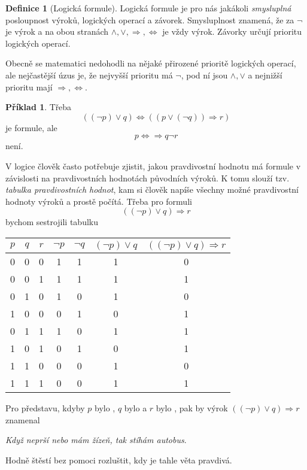 \documentclass[a4paper,11pt]{article}
\theoremstyle{definition}
\newtheorem{exm}[thm]{Příklad}
\newtheorem{dfn}[thm]{Definice}
\theoremstyle{plain}
\begin{document}
\begin{dfn}[Logická formule]
 Logická formule je pro nás jakákoli \emph{smysluplná} posloupnost výroků,
 logických operací a závorek. Smysluplnost znamená, že za $\neg$ je výrok a na
 obou stranách $ \wedge , \vee , \Rightarrow , \Leftrightarrow $ je vždy výrok.
 Závorky určují prioritu logických operací.
\end{dfn}

Obecně se matematici nedohodli na nějaké přirozené prioritě logických operací,
ale nejčastější úzus je, že nejvyšší prioritu má $\neg$, pod ní jsou  $ \wedge ,
\vee $ a nejnižší prioritu mají $ \Rightarrow , \Leftrightarrow $.

\begin{exm}
 \label{exm:formula}
 Třeba
 \[
  ((\neg p) \vee q) \Leftrightarrow ((p \vee (\neg q)) \Rightarrow r) 
 \]
 je formule, ale
 \[
  p \Leftrightarrow  \Rightarrow q \neg r
 \]
 není.
\end{exm}

V logice člověk často potřebuje zjistit, jakou pravdivostní hodnotu má formule v
závislosti na pravdivostních hodnotách původních výroků. K tomu slouží tzv.
\emph{tabulka pravdivostních hodnot}, kam si člověk napíše všechny možné
pravdivostní hodnoty výroků a prostě počítá. Třeba pro formuli 
\[
 ((\neg p) \vee q) \Rightarrow r
\]
bychom sestrojili tabulku

\begin{center}
 \begin{tabular}{c|c|c|c|c|c|c}
  $p$ & $q$ & $r$ & $\neg p$ & $\neg q$ & $(\neg p) \vee q$ & $((\neg p) \vee q)
  \Rightarrow r$\\
  \midrule
  0 & 0 & 0 & 1 & 1 & 1 & 0\\
  0 & 0 & 1 & 1 & 1 & 1 & 1\\
  0 & 1 & 0 & 1 & 0 & 1 & 0\\
  1 & 0 & 0 & 0 & 1 & 0 & 1\\
  0 & 1 & 1 & 1 & 0 & 1 & 1\\
  1 & 0 & 1 & 0 & 1 & 0 & 1\\
  1 & 1 & 0 & 0 & 0 & 1 & 0\\
  1 & 1 & 1 & 0 & 0 & 1 & 1
 \end{tabular}
\end{center}

Pro představu, kdyby $p$ bylo , $q$ bylo  a $r$ bylo
, pak by výrok $((\neg p) \vee q) \Rightarrow r$ znamenal
\begin{center}
 \emph{Když neprší nebo mám žízeň, tak stíhám autobus}.
\end{center}
Hodně štěstí bez pomoci rozluštit, kdy je tahle věta pravdivá.
\end{document}

